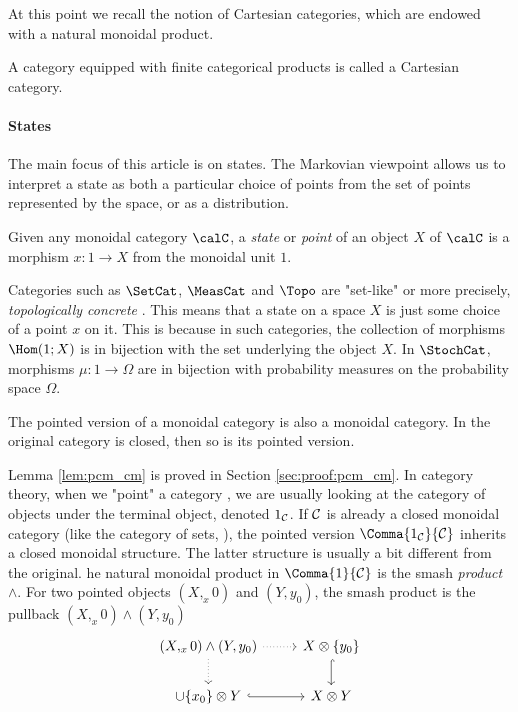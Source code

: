\documentclass[12pt,oneside,pb-diagram]{article}
\begin{document}
At this point we recall the notion of Cartesian categories, which are endowed with a natural monoidal product.

\begin{definition} 
	A category equipped with finite categorical products is called a Cartesian category.
\end{definition}

\paragraph{States} The main focus of this article is on states. The Markovian viewpoint allows us to interpret a state as both a particular choice of points from the set of points represented by the space, or as a distribution.

\begin{definition} 
	Given any monoidal category $\calC$, a \textit{state} or \textit{point} of an object $X$ of $\calC$ is a morphism $x : 1\to X$ from the monoidal unit $1$.
\end{definition}

\begin{Erg}{}{} 
	Categories such as $\SetCat$, $\MeasCat$ and $\Topo$ are "set-like" or more precisely, \textit{topologically concrete} \cite[see]{DasSuda2024recon}. This means that a state on a space $X$ is just some choice of a point $x$ on it. This is because in such categories, the collection of morphisms $\Hom(1;X)$ is in bijection with the set underlying the object $X$. In $\StochCat$, morphisms $\mu :1 \to \Omega$ are in bijection with probability measures on the probability space $\Omega$.
\end{Erg}

\begin{lemma} \label{lem:pcm_cm}
	The pointed version of a monoidal category is also a monoidal category. In the original category is closed, then so is its pointed version.
\end{lemma}

Lemma \ref{lem:pcm_cm} is proved in Section \ref{sec:proof:pcm_cm}.
In category theory, when we "point" a category , we are usually looking at the category of objects under the terminal object, denoted $1_{\operatorname{\mathcal{C}}}$. If $\operatorname{\mathcal{C}}$ is already a closed monoidal category (like the category of sets, ), the pointed version $\Comma{1_{\Context}}{\Context}$ inherits a closed monoidal structure. The latter structure is usually a bit different from the original. he natural monoidal product in $\Comma{1}{\Context}$ is the smash \textit{product} $\wedge$. For two pointed objects $(X,_x0)$ and $(Y, y_0)$, the smash product is the pullback $(X,_x0) \wedge (Y, y_0)$
%
\begin{equation}
	\begin{tikzcd}
		(X,_x0) \wedge (Y, y_0) \arrow[r, dotted] \arrow[d, dotted] & X \otimes \{y_0\} \arrow[d, hook] \\
		\cup \{x_0\} \otimes Y \arrow[r, hook] & X \otimes Y
	\end{tikzcd}
\end{equation}
%
\end{document}
